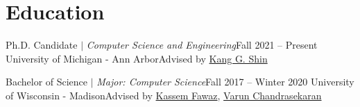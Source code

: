 \section{Education}
  \CVSubHeadingListStart
    \CVSubheading
      {{Ph.D. Candidate $|$ \emph{\small{Computer Science and Engineering}}}}{Fall 2021 -- Present}
      {University of Michigan - Ann Arbor}{Advised by \href{https://web.eecs.umich.edu/~kgshin/}{Kang G. Shin}}

    \CVSubheading
      {{Bachelor of Science $|$ \emph{\small{Major: Computer Science}}}}{Fall 2017 -- Winter 2020}
      {University of Wisconsin - Madison}{Advised by \href{https://kassemfawaz.com/}{Kassem Fawaz}, \href{https://pages.cs.wisc.edu/~chandrasekaran/}{Varun Chandrasekaran}}
  \CVSubHeadingListEnd